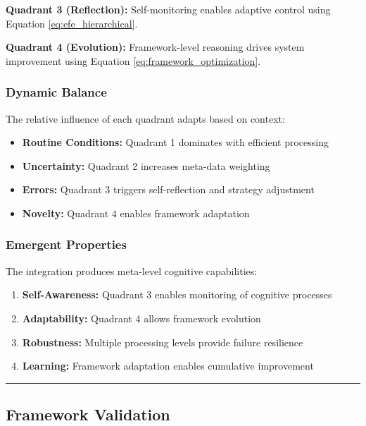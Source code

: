 \documentclass[
]{article}
\providecommand{\tightlist}{%
  \setlength{\itemsep}{0pt}\setlength{\parskip}{0pt}}
\begin{document}
\textbf{Quadrant 3 (Reflection):} Self-monitoring enables adaptive
control using Equation \eqref{eq:efe_hierarchical}.

\textbf{Quadrant 4 (Evolution):} Framework-level reasoning drives system
improvement using Equation \eqref{eq:framework_optimization}.

\subsubsection{Dynamic Balance}\label{dynamic-balance}

The relative influence of each quadrant adapts based on context:

\begin{itemize}
\tightlist
\item
  \textbf{Routine Conditions:} Quadrant 1 dominates with efficient
  processing
\item
  \textbf{Uncertainty:} Quadrant 2 increases meta-data weighting
\item
  \textbf{Errors:} Quadrant 3 triggers self-reflection and strategy
  adjustment
\item
  \textbf{Novelty:} Quadrant 4 enables framework adaptation
\end{itemize}

\subsubsection{Emergent Properties}\label{emergent-properties}

The integration produces meta-level cognitive capabilities:

\begin{enumerate}
\def\labelenumi{\arabic{enumi}.}
\tightlist
\item
  \textbf{Self-Awareness:} Quadrant 3 enables monitoring of cognitive
  processes
\item
  \textbf{Adaptability:} Quadrant 4 allows framework evolution
\item
  \textbf{Robustness:} Multiple processing levels provide failure
  resilience
\item
  \textbf{Learning:} Framework adaptation enables cumulative improvement
\end{enumerate}

\begin{center}\rule{0.5\linewidth}{0.5pt}\end{center}

\subsection{Framework Validation}\label{sec:framework_validation}
\end{document}
